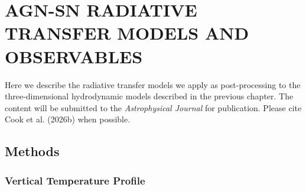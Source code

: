 \section{\texorpdfstring{\MakeUppercase{agn-sn radiative transfer models and observables}}{agn-sn radiative transfer models and observables}}
\label{sec:sn-rt}



Here we describe the radiative transfer models we apply as post-processing to the three-dimensional hydrodynamic models described in the previous chapter.
The content will be submitted to the \textit{Astrophysical Journal} for publication.
Please cite Cook et al. (2026b) when possible.


\subsection{Methods} \label{sec:methods}


\subsubsection{Vertical Temperature Profile} \label{subsec:temperature-profile}

